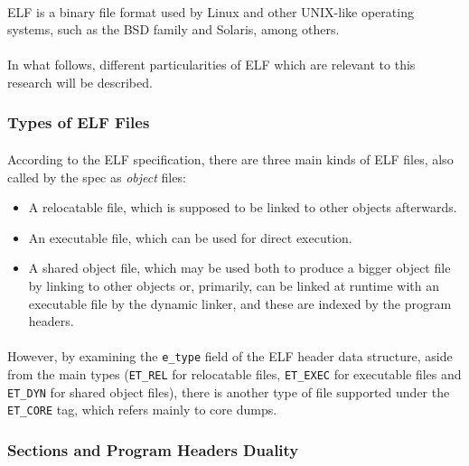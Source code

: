 \documentclass[12pt]{article}
\begin{document}
	\paragraph{}\acrshort{ELF} is a binary file format used by Linux and other UNIX-like operating systems, such as the \acrshort{BSD} family and Solaris, among others.
	\paragraph{}In what follows, different particularities of ELF which are relevant to this research will be described.
	
	\subsubsection{Types of ELF Files}
	
	\paragraph{}According to the \acrshort{ELF} specification\cite{elf-spec}, there are three main kinds of \acrshort{ELF} files, also called by the spec as \textit{object} files:
	\begin{itemize}
		\item A relocatable file, which is supposed to be linked to other objects afterwards.
		\item An executable file, which can be used for direct execution.
		\item A shared object file, which may be used both to produce a bigger object file by linking to other objects or, primarily, can be linked at runtime with an executable file by the dynamic linker, and these are indexed by the program headers.
	\end{itemize}
	\paragraph{}However, by examining the \verb|e_type| field of the \acrshort{ELF} header data structure, aside from the main types (\verb|ET_REL| for relocatable files, \verb|ET_EXEC| for executable files and \verb|ET_DYN| for shared object files), there is another type of file supported under the \verb|ET_CORE| tag, which refers mainly to core dumps.
	
	\subsubsection{Sections and Program Headers Duality}
	
\end{document}
